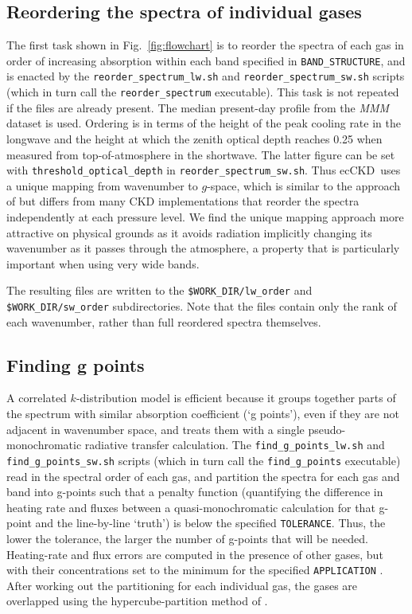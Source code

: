 \documentclass[a4,oneside]{article}
\def\codesize{\small}
\newcommand{\ecckd}{ecCKD}
\def\codesize{\small}
\def\code#1{{\codesize\texttt{#1}}}
\begin{document}
\subsection{Reordering the spectra of individual gases}
The first task shown in Fig.\ \ref{fig:flowchart} is to reorder the
spectra of each gas in order of increasing absorption within each band
specified in \code{BAND\_STRUCTURE}, and is enacted by the
\code{reorder\_spectrum\_lw.sh} and \code{reorder\_spectrum\_sw.sh}
scripts (which in turn call the \code{reorder\_spectrum}
executable). This task is not repeated if the files are already
present. The median present-day profile from the \emph{MMM} dataset is
used. Ordering is in terms of the height of the peak cooling rate in
the longwave \citep[see][for details]{Hogan2010} and the height at
which the zenith optical depth reaches 0.25 when measured from
top-of-atmosphere in the shortwave. The latter figure can be set with
\code{threshold\_optical\_depth} in
\code{reorder\_spectrum\_sw.sh}. Thus \ecckd\ uses a unique mapping
from wavenumber to $g$-space, which is similar to the approach of
\cite{Doppler+2014} but differs from many CKD implementations that
reorder the spectra independently at each pressure level. We find the
unique mapping approach more attractive on physical grounds as it
avoids radiation implicitly changing its wavenumber as it passes
through the atmosphere, a property that is particularly important when
using very wide bands.

The resulting files are written to the \code{\$WORK\_DIR/lw\_order}
and \code{\$WORK\_DIR/sw\_order} subdirectories.  Note that the files
contain only the rank of each wavenumber, rather than full reordered
spectra themselves.

\subsection{Finding g points}
A correlated $k$-distribution model is efficient because it groups
together parts of the spectrum with similar absorption coefficient (`g
points'), even if they are not adjacent in wavenumber space, and
treats them with a single pseudo-monochromatic radiative transfer
calculation.  The \code{find\_g\_points\_lw.sh} and
\code{find\_g\_points\_sw.sh} scripts (which in turn call the
\code{find\_g\_points} executable) read in the spectral order of each
gas, and partition the spectra for each gas and band into g-points
such that a penalty function (quantifying the difference in heating
rate and fluxes between a quasi-monochromatic calculation for that
g-point and the line-by-line `truth') is below the specified
\code{TOLERANCE}. Thus, the lower the tolerance, the larger the number
of g-points that will be needed. Heating-rate and flux errors are
computed in the presence of other gases, but with their concentrations
set to the minimum for the specified \code{APPLICATION} \citep[for all
applications the minimum water vapour and ozone are taken from the
\emph{MMM} dataset, while for the climate application the greenhouse
gas concentrations are set to the minima of the scenarios listed in
Table 2 of][]{Hogan&2020}.  After working out the partitioning for
each individual gas, the gases are overlapped using the
hypercube-partition method of \cite{Hogan2010}.
\end{document}
